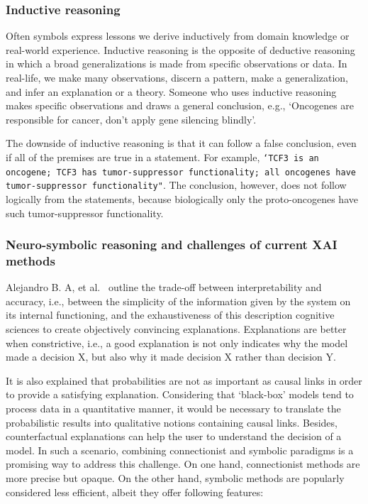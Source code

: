 \subsubsection{Inductive reasoning} 
Often symbols express lessons we derive inductively from domain knowledge or real-world experience. Inductive reasoning is the opposite of deductive reasoning in which a broad generalizations is made from specific observations or data. In real-life, we make many observations, discern a pattern, make a generalization, and infer an explanation or a theory. Someone who uses inductive reasoning makes specific observations and draws a general conclusion, e.g., `Oncogenes are responsible for cancer, don't apply gene silencing blindly'. 

The downside of inductive reasoning is that it can follow a false conclusion, even if all of the premises are true in a statement. For example, \texttt{`TCF3 is an oncogene; TCF3 has tumor-suppressor functionality; all oncogenes have tumor-suppressor functionality"}. The conclusion, however, does not follow logically from the statements, because biologically only the proto-oncogenes have such tumor-suppressor functionality.

\subsubsection{Neuro-symbolic reasoning and challenges of current XAI methods}
Alejandro B. A, et al.~\cite{arrieta2020explainable} outline the trade-off between interpretability and accuracy, i.e., between the simplicity of the information given by the system on its internal functioning, and the exhaustiveness of this description cognitive sciences to create objectively convincing explanations.
Explanations are better when constrictive, i.e., a good explanation is not only indicates why the model made a decision $\mathrm{X}$, but also why it made decision $\mathrm{X}$ rather than decision $\mathrm{Y}$. 

\hspace*{3.5mm}It is also explained that probabilities are not as important as causal links in order to provide a satisfying explanation. Considering that `black-box' models tend to process data in a quantitative manner, it would be necessary to translate the probabilistic results into qualitative notions containing causal links. Besides, counterfactual explanations can help the user to understand the decision of a model. In such a scenario, combining connectionist and symbolic paradigms is a promising way to address this challenge. On one hand, connectionist methods are more precise but opaque. On the other hand, symbolic methods are popularly considered less efficient, albeit they offer following features:

